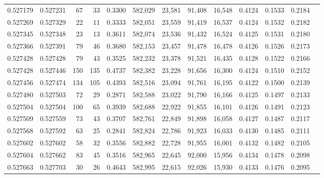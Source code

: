 \begin{tabular}{rrrrrrrrrrrrr}
0.527179 & 0.527231 &    67 &    33 &                                     0.3300 & 582,029 &  23,581 &  91,408 &  16,548 & 0.4124 & 0.1533 & 0.2184 \\
0.527269 & 0.527329 &    22 &    11 &                                     0.3333 & 582,051 &  23,559 &  91,419 &  16,537 & 0.4124 & 0.1532 & 0.2182 \\
0.527345 & 0.527348 &    23 &    13 &                                     0.3611 & 582,074 &  23,536 &  91,432 &  16,524 & 0.4125 & 0.1531 & 0.2180 \\
0.527366 & 0.527391 &    79 &    46 &                                     0.3680 & 582,153 &  23,457 &  91,478 &  16,478 & 0.4126 & 0.1526 & 0.2173 \\
0.527428 & 0.527428 &    79 &    43 &                                     0.3525 & 582,232 &  23,378 &  91,521 &  16,435 & 0.4128 & 0.1522 & 0.2166 \\
0.527428 & 0.527446 &   150 &   135 &                                     0.4737 & 582,382 &  23,228 &  91,656 &  16,300 & 0.4124 & 0.1510 & 0.2152 \\
0.527456 & 0.527474 &   134 &   105 &                                     0.4393 & 582,516 &  23,094 &  91,761 &  16,195 & 0.4122 & 0.1500 & 0.2139 \\
0.527480 & 0.527503 &    72 &    29 &                                     0.2871 & 582,588 &  23,022 &  91,790 &  16,166 & 0.4125 & 0.1497 & 0.2133 \\
0.527504 & 0.527504 &   100 &    65 &                                     0.3939 & 582,688 &  22,922 &  91,855 &  16,101 & 0.4126 & 0.1491 & 0.2123 \\
0.527509 & 0.527559 &    73 &    43 &                                     0.3707 & 582,761 &  22,849 &  91,898 &  16,058 & 0.4127 & 0.1487 & 0.2117 \\
0.527568 & 0.527592 &    63 &    25 &                                     0.2841 & 582,824 &  22,786 &  91,923 &  16,033 & 0.4130 & 0.1485 & 0.2111 \\
0.527602 & 0.527602 &    58 &    32 &                                     0.3556 & 582,882 &  22,728 &  91,955 &  16,001 & 0.4132 & 0.1482 & 0.2105 \\
0.527604 & 0.527662 &    83 &    45 &                                     0.3516 & 582,965 &  22,645 &  92,000 &  15,956 & 0.4134 & 0.1478 & 0.2098 \\
0.527663 & 0.527703 &    30 &    26 &                                     0.4643 & 582,995 &  22,615 &  92,026 &  15,930 & 0.4133 & 0.1476 & 0.2095 \\

\end{tabular}
